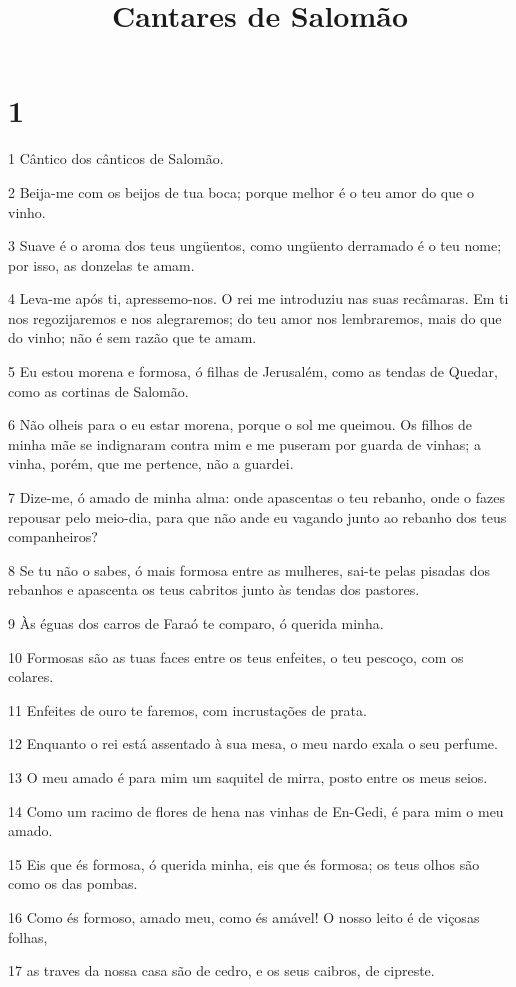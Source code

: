

\title{Cantares de Salomão}


\chapter{1}

\par 1 Cântico dos cânticos de Salomão.
\par 2 Beija-me com os beijos de tua boca; porque melhor é o teu amor do que o vinho.
\par 3 Suave é o aroma dos teus ungüentos, como ungüento derramado é o teu nome; por isso, as donzelas te amam.
\par 4 Leva-me após ti, apressemo-nos. O rei me introduziu nas suas recâmaras. Em ti nos regozijaremos e nos alegraremos; do teu amor nos lembraremos, mais do que do vinho; não é sem razão que te amam.
\par 5 Eu estou morena e formosa, ó filhas de Jerusalém, como as tendas de Quedar, como as cortinas de Salomão.
\par 6 Não olheis para o eu estar morena, porque o sol me queimou. Os filhos de minha mãe se indignaram contra mim e me puseram por guarda de vinhas; a vinha, porém, que me pertence, não a guardei.
\par 7 Dize-me, ó amado de minha alma: onde apascentas o teu rebanho, onde o fazes repousar pelo meio-dia, para que não ande eu vagando junto ao rebanho dos teus companheiros?
\par 8 Se tu não o sabes, ó mais formosa entre as mulheres, sai-te pelas pisadas dos rebanhos e apascenta os teus cabritos junto às tendas dos pastores.
\par 9 Às éguas dos carros de Faraó te comparo, ó querida minha.
\par 10 Formosas são as tuas faces entre os teus enfeites, o teu pescoço, com os colares.
\par 11 Enfeites de ouro te faremos, com incrustações de prata.
\par 12 Enquanto o rei está assentado à sua mesa, o meu nardo exala o seu perfume.
\par 13 O meu amado é para mim um saquitel de mirra, posto entre os meus seios.
\par 14 Como um racimo de flores de hena nas vinhas de En-Gedi, é para mim o meu amado.
\par 15 Eis que és formosa, ó querida minha, eis que és formosa; os teus olhos são como os das pombas.
\par 16 Como és formoso, amado meu, como és amável! O nosso leito é de viçosas folhas,
\par 17 as traves da nossa casa são de cedro, e os seus caibros, de cipreste.


